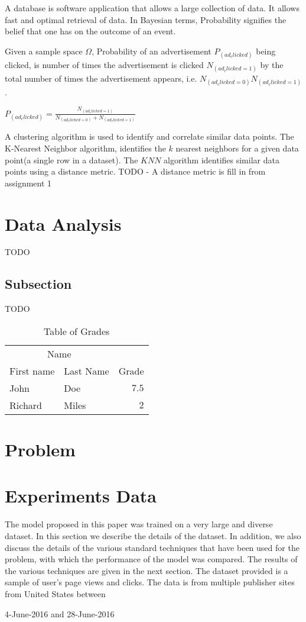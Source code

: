 \documentclass[fleqn,10pt]{SelfArx} %
\begin{document}
A database is software application that allows a large collection of data. It allows fast and optimal retrieval of data.
In Bayesian terms, Probability signifies the belief that one has on the outcome of an event. 


Given a sample space $\Omega$, Probability of an advertisement $P_(ad_clicked)$ being clicked, is number of times the advertisement is clicked $N_(ad_clicked = 1)$ by the total number of times the advertisement appears, i.e. $N_(ad_clicked = 0)  N_(ad_clicked = 1)$. 


$P_(ad_clicked)  = \frac{N_(ad_clicked = 1)}{N_(ad_clicked = 0) + N_(ad_clicked = 1)}$


A clustering algorithm is used to identify and correlate similar data points. The K-Nearest Neighbor algorithm, identifies the $k$ nearest neighbors for a given data point(a single row in a dataset). The $KNN$ algorithm identifies similar data points using a distance metric. 
TODO - A distance metric is fill in from assignment 1



\section{Data Analysis}

TODO

\subsection{Subsection}

TODO 

\begin{table}[hbt]
\caption{Table of Grades}
\centering
\begin{tabular}{llr}
\toprule
\multicolumn{2}{c}{Name} \\
\cmidrule(r){1-2}
First name & Last Name & Grade \\
\midrule
John & Doe & $7.5$ \\
Richard & Miles & $2$ \\
\bottomrule
\end{tabular}
\label{tab:label}
\end{table}

\section{Problem}

\section{Experiments Data}
The model proposed in this paper was trained on a very
large and diverse dataset. In this section we describe the
details of the dataset. In addition, we also discuss the details
of the various standard techniques that have been used for
the problem, with which the performance of the model was
compared. The results of the various techniques are given
in the next section.
The dataset provided is a sample of user's page views and clicks. The data is from multiple publisher sites from United States between \date 14-June-2016 and 28-June-2016
\end{document}

